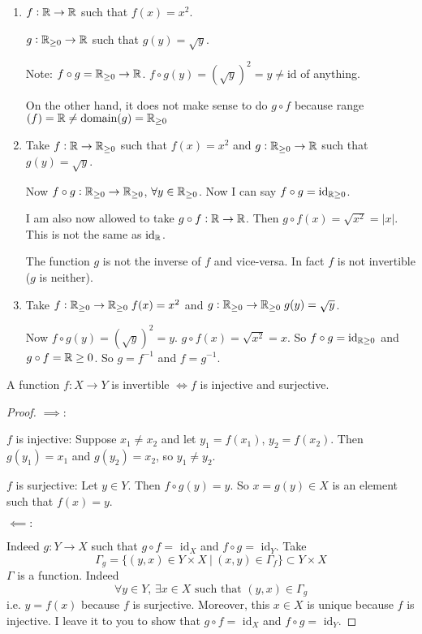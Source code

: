 \documentclass[twoside]{scrartcl}
\begin{document}
\begin{examples}
\begin{enumerate}
\item $f: \mathbb{R} \to \mathbb{R}$ such that $f(x) = x^2$. 

$g: \mathbb{R}_{\geq 0} \to \mathbb{R}$ such that $g(y) = \sqrt{y}$. 

Note: $f \circ g = \mathbb{R}_{\geq 0} \to \mathbb{R}$. $f \circ g(y) = (\sqrt{y})^2 = y \neq \text{id}$ of anything. 

On the other hand, it does not make sense to do $g \circ f$ because range$(f) = \mathbb{R} \neq \text{domain}(g) = \mathbb{R}_{\geq 0}$
\item Take  $f: \mathbb{R} \to \mathbb{R}_{\geq 0}$ such that $f(x) = x^2$ and $g: \mathbb{R}_{\geq 0} \to \mathbb{R}$ such that $g(y) = \sqrt{y}$.

Now $f\circ g : \mathbb{R}_{\geq 0} \to \mathbb{R}_{\geq 0}$, $\forall y \in \mathbb{R}_{\geq 0}$. Now I can say $f \circ g = \mathrm{id}_{\mathbb{R} \geq 0}$. 

I am also now allowed to take $g \circ f: \mathbb{R} \to \mathbb{R}$. Then $g\circ f(x) = \sqrt{x^2}= |x|$. This is not the same as $\mathrm{id}_{\mathbb{R}}$. 

The function $g$ is not the inverse of $f$ and vice-versa. In fact $f$ is not invertible ($g$ is neither). \pagebreak

\item Take $f: \mathbb{R}_{\geq 0} \to \mathbb{R}_{\geq 0}\; f(x) = x^2$ and $g: \mathbb{R}_{\geq 0} \to \mathbb{R}_{\geq 0}\; g(y) = \sqrt{y}$. 

Now $f \circ g (y) = (\sqrt{y})^2 = y$. $g \circ f(x) = \sqrt{x^2}=x$. So $f\circ g = \mathrm{id}_{\mathbb{R} \geq 0}$ and $g \circ f = \mathrm{\mathbb{R} \geq 0}$. So $g = f^{-1}$ and $f = g^{-1}$. 
\end{enumerate}
\end{examples}


\begin{theorem}
A function $f: X \to Y$ is invertible $\iff f$ is injective and surjective. 	
\end{theorem}

\begin{proof} $\implies$:

$f$ is injective: Suppose $x_1 \neq x_2$ and let $y_1 = f(x_1)$, $y_2 = f(x_2)$. Then $g(y_1) = x_1$ and $g(y_2) = x_2$, so $y_1 \neq y_2$. 

$f$ is surjective: Let $y \in Y$. Then $f \circ g(y) = y$. So $x = g(y) \in X$ is an element such that $f(x) = y$. 

$\impliedby:$

Indeed $g: Y \to X$ such that $g \circ f = \text{ id}_X$ and $f \circ g = \text{ id}_Y$. Take 
\[\Gamma_g = \{(y,x) \in Y \times X ~|~ (x,y) \in \Gamma_f \} \subset Y \times X\]	
$\Gamma$ is a function. Indeed
\[\forall y \in Y,\, \exists x \in X\text{ such that } (y,x) \in \Gamma_g\]
i.e. $y = f(x)$ because $f$ is surjective. Moreover, this $x \in X$ is unique because $f$ is injective. I leave it to you to show that $g \circ f =\text{ id}_X$ and $f\circ g = \text{ id}_Y$. 
\end{proof}
\end{document}
